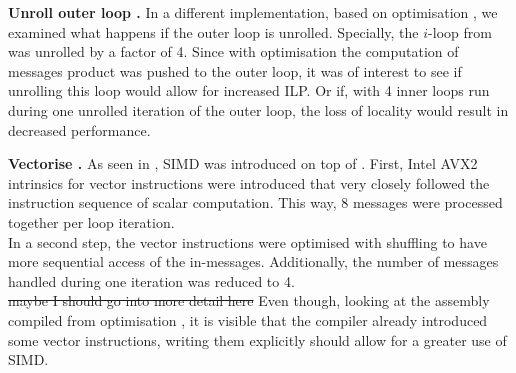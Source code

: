 \documentclass[letterpaper]{article}
\let\cref=\Cref %
\newcommand{\mypar}[1]{{\bf #1.}}
\begin{document}
\mypar{Unroll outer loop }
In a different implementation, based on optimisation , we examined what happens if the outer loop is unrolled. Specially, the $i$-loop from \cref{algo:propagate} was unrolled by a factor of 4. Since with optimisation  the computation of messages product was pushed to the outer loop, it was of interest to see if unrolling this loop would allow for increased ILP. Or if, with 4 inner loops run during one unrolled iteration of the outer loop, the loss of locality would result in decreased performance.

\mypar{Vectorise }
As seen in \cref{OptDiagram}, SIMD was introduced on top of . First, Intel AVX2 intrinsics for vector instructions were introduced that very closely followed the instruction sequence of scalar computation. This way, 8 messages were processed together per loop iteration.\\
In a second step, the vector instructions were optimised with shuffling to have more sequential access of the in-messages. Additionally, the number of messages handled during one iteration was reduced to 4.\\ \st{maybe I should go into more detail here}
Even though, looking at the assembly compiled from optimisation , it is visible that the compiler already introduced some vector instructions, writing them explicitly should allow for a greater use of SIMD.

\end{document}
